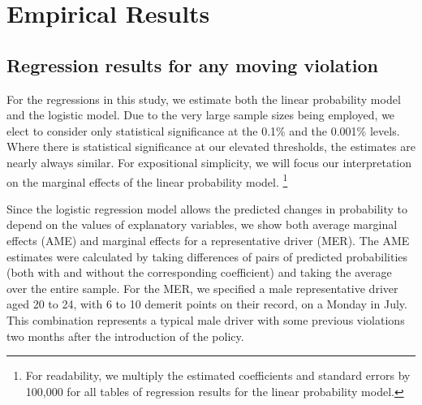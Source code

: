 \section{Empirical Results}
\label{sec:Empirical}


\subsection{Regression results for any moving violation}
\label{sec:Empirical_all}

For the regressions in this study, we estimate both the linear probability model and the logistic model. 
%
Due to the very large sample sizes being employed, 
we elect to consider only statistical significance at the 0.1\% and the 0.001\% levels. 
%
Where there is statistical significance at our elevated thresholds, 
the estimates are nearly always similar. 
For expositional simplicity, we will focus our interpretation on 
the marginal effects of the linear probability model.%
\footnote{%
For readability, we multiply the estimated coefficients and standard errors by 100,000 
for all tables of regression results for the linear probability model.
% 
}






Since the logistic regression model allows the predicted changes in probability to depend on
the values of explanatory variables, 
we show both average marginal effects (AME)
and marginal effects for a representative driver (MER). 
% 
The AME estimates were calculated by taking differences of pairs of 
predicted probabilities (both with and without the corresponding coefficient)
and taking the average over the entire sample. 
%
For the MER, 
we specified a male representative driver aged 20 to 24, 
with 6 to 10 demerit points on their record, 
on a Monday in July.
This combination represents a typical male driver with some previous violations two months after the introduction of the policy. 

